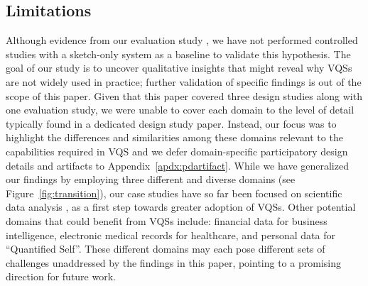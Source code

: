  \subsection{Limitations}%
 \par Although evidence from our evaluation study , we have not performed controlled studies with a sketch-only system as a baseline to validate this hypothesis. The goal of our study is to uncover qualitative insights that might reveal why VQSs are not widely used in practice; further validation of specific findings is out of the scope of this paper.  Given that this paper covered three design studies along with one evaluation study, we were unable to cover each domain to the level of detail typically found in a dedicated design study paper. Instead, our focus was to highlight the differences and similarities among these domains relevant to the capabilities required in VQS and we defer domain-specific participatory design details and artifacts to Appendix~\ref{apdx:pdartifact}.  While we have generalized our findings  by employing three different and diverse domains (see Figure~\ref{fig:transition}),
 our case studies have so far
 been focused on scientific data analysis ,
 as a first step towards greater adoption of VQSs.
 Other potential domains that could benefit from VQSs include:
 financial data for business intelligence,
 electronic medical records for healthcare,
 and personal data for ``Quantified Self''.
 These different domains may each pose different sets of challenges  unaddressed by the findings in this paper,
  pointing to a promising direction for future work.